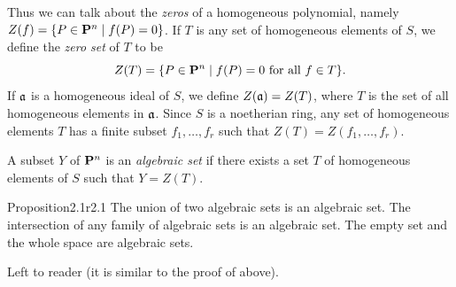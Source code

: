 {Thus we can talk about the \emph{zeros} of a homogeneous polynomial, namely $Z(f)=\{P\in\mathbf{P}^n\mid f(P)=0\}$. If $T$ is any set of homogeneous elements of $S$, we define the \emph{zero set} of $T$ to be
\[
Z(T)=\{P\in\mathbf{P}^n\mid f(P)=0\text{ for all } f\in T\}.
\]
If $\mathfrak a$ is a homogeneous ideal of $S$, we define $Z(\mathfrak a)=Z(T)$, where $T$ is the set of all homogeneous elements in $\mathfrak a$. Since $S$ is a noetherian ring, any set of homogeneous elements $T$ has a finite subset $f_1,\ldots,f_r$ such that $Z(T)=Z(f_1,\ldots,f_r)$.

\Dfn A subset $Y$ of $\mathbf{P}^n$ is an \emph{algebraic set} if there exists a set $T$ of homogeneous elements of $S$ such that $Y=Z(T)$.

\begin{result}{Proposition}{2.1}{r2.1}
The union of two algebraic sets is an algebraic set. The intersection of any family of algebraic sets is an algebraic set. The empty set and the whole space are algebraic sets.
\end{result}
\Proof Left to reader (it is similar to the proof of  above).
}


